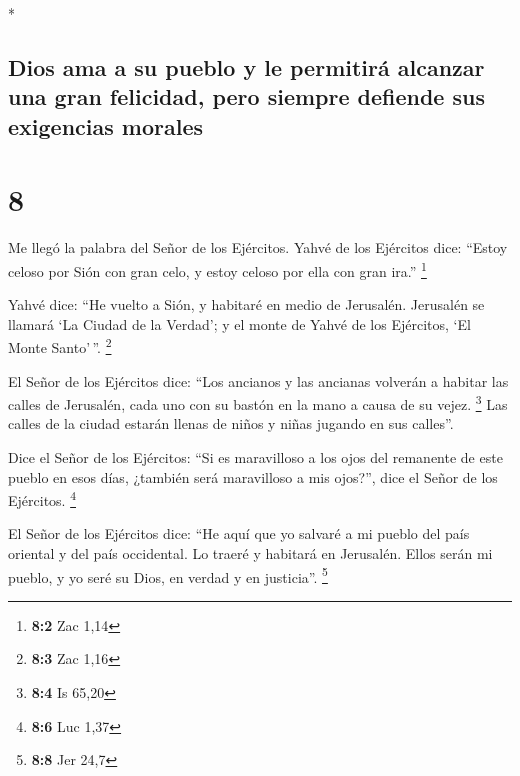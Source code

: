 \begin{paracol}{2}
\begin{otherlanguage}{english}
\end{otherlanguage}

\switchcolumn[0]*

\hypertarget{dios-ama-a-su-pueblo-y-le-permitiruxe1-alcanzar-una-gran-felicidad-pero-siempre-defiende-sus-exigencias-morales}{%
\subsection{Dios ama a su pueblo y le permitirá alcanzar una gran
felicidad, pero siempre defiende sus exigencias
morales}\label{dios-ama-a-su-pueblo-y-le-permitiruxe1-alcanzar-una-gran-felicidad-pero-siempre-defiende-sus-exigencias-morales}}

\hypertarget{section-14}{%
\section{8}\label{section-14}}

 Me llegó la palabra del Señor de los Ejércitos.
 Yahvé de los Ejércitos dice: ``Estoy celoso por Sión con
gran celo, y estoy celoso por ella con gran ira.'' \footnote{\textbf{8:2}
  Zac 1,14}

 Yahvé dice: ``He vuelto a Sión, y habitaré en medio de
Jerusalén. Jerusalén se llamará `La Ciudad de la Verdad'; y el monte de
Yahvé de los Ejércitos, `El Monte Santo'\,''. \footnote{\textbf{8:3} Zac
  1,16}

 El Señor de los Ejércitos dice: ``Los ancianos y las
ancianas volverán a habitar las calles de Jerusalén, cada uno con su
bastón en la mano a causa de su vejez. \footnote{\textbf{8:4} Is 65,20}
 Las calles de la ciudad estarán llenas de niños y niñas
jugando en sus calles''.

 Dice el Señor de los Ejércitos: ``Si es maravilloso a los
ojos del remanente de este pueblo en esos días, ¿también será
maravilloso a mis ojos?'', dice el Señor de los Ejércitos. \footnote{\textbf{8:6}
  Luc 1,37}

 El Señor de los Ejércitos dice: ``He aquí que yo salvaré
a mi pueblo del país oriental y del país occidental.  Lo
traeré y habitará en Jerusalén. Ellos serán mi pueblo, y yo seré su
Dios, en verdad y en justicia''. \footnote{\textbf{8:8} Jer 24,7}


\end{paracol}
